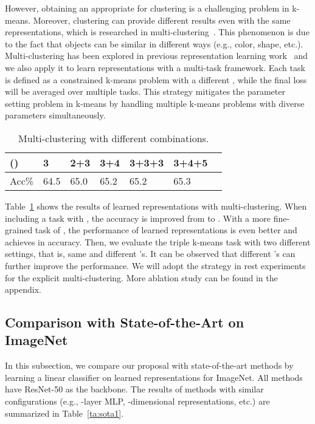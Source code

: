 \documentclass[10pt,twocolumn,letterpaper]{article}
\begin{document}
However, obtaining an appropriate  for clustering is a challenging problem in k-means. Moreover, clustering can provide different results even with the same representations, which is researched in multi-clustering~\cite{HuQPJZ17,hu2018subspace}. This phenomenon is due to the fact that objects can be similar in different ways (e.g., color, shape, etc.). Multi-clustering has been explored in previous representation learning work~\cite{AsanoRV20a,abs-2005-04966} and we also apply it to learn representations with a multi-task framework. Each task is defined as a constrained k-means problem with a different , while the final loss will be averaged over multiple tasks. This strategy mitigates the parameter setting problem in k-means by handling multiple k-means problems with diverse parameters simultaneously.

\begin{table}[!ht]
\centering
\begin{tabular}{|l|l|l|l|l|l|l|}\hline
()&3&2+3&3+4&3+3+3&3+4+5\\\hline
Acc\% &64.5&65.0&65.2&65.2&65.3\\\hline
\end{tabular}
\caption{Multi-clustering with different  combinations.}\label{ta:multik}
\end{table}

Table~\ref{ta:multik} shows the results of learned representations with multi-clustering. When including a task with , the accuracy is improved from  to . With a more fine-grained task of , the performance of learned representations is even better and achieves  in accuracy. Then, we evaluate the triple k-means task with two different settings, that is, same  and different 's. It can be observed that different 's can further improve the performance. We will adopt the strategy in rest experiments for the explicit multi-clustering. More ablation study can be found in the appendix.


\subsection{Comparison with State-of-the-Art on ImageNet}
In this subsection, we compare our proposal with state-of-the-art methods by learning a linear classifier on learned representations for ImageNet. All methods have ResNet-50 as the backbone. The results of methods with similar configurations (e.g., -layer MLP, -dimensional representations, etc.) are summarized in Table~\ref{ta:sota1}. 
\end{document}
